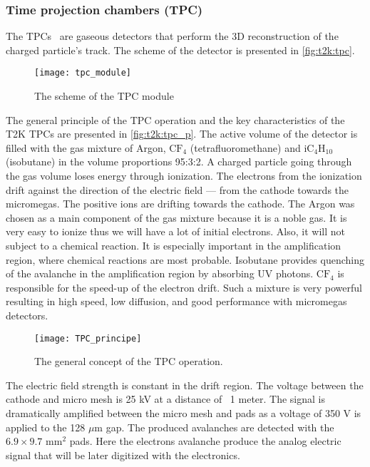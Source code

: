 \documentclass[../main.tex]{subfiles}
\begin{document}
\subsubsection{Time projection chambers (TPC)}
\label{sec:t2k:tpc}
The TPCs~\cite{Abgrall2011} are gaseous detectors that perform the 3D reconstruction of the charged particle's track. The scheme of the detector is presented in \autoref{fig:t2k:tpc}.

\begin{figure}[!ht]
  \centering
  \texttt{[image: tpc\_module]}
  \caption{The scheme of the TPC module}
  \label{fig:t2k:tpc}
\end{figure}

The general principle of the TPC operation and the key characteristics of the T2K TPCs are presented in \autoref{fig:t2k:tpc_p}. The active volume of the detector is filled with the gas mixture of Argon, $\text{CF}_4$ (tetrafluoromethane) and $\text{iC}_4\text{H}_{10}$ (isobutane) in the volume proportions 95:3:2. A charged particle going through the gas volume loses energy through ionization. The electrons from the ionization drift against the direction of the electric field --- from the cathode towards the micromegas. The positive ions are drifting towards the cathode. The Argon was chosen as a main component of the gas mixture because it is a noble gas. It is very easy to ionize thus we will have a lot of initial electrons. Also, it will not subject to a chemical reaction. It is especially important in the amplification region, where chemical reactions are most probable. Isobutane provides quenching of the avalanche in the amplification region by absorbing UV photons. $\text{CF}_4$ is responsible for the speed-up of the electron drift. Such a mixture is very powerful resulting in high speed, low diffusion, and good performance with micromegas detectors.

\begin{figure}[!ht]
  \centering
  \texttt{[image: TPC\_principe]}
  \caption{The general concept of the TPC operation.}
  \label{fig:t2k:tpc_p}
\end{figure}

The electric field strength is constant in the drift region. The voltage between the cathode and micro mesh is 25 kV at a distance of ~1 meter. The signal is dramatically amplified between the micro mesh and pads as a voltage of 350 V is applied to the 128 $\mu \text{m}$ gap. The produced avalanches are detected with the $6.9\times9.7$ $\text{mm}^2$ pads. Here the electrons avalanche produce the analog electric signal that will be later digitized with the electronics.
\end{document}
